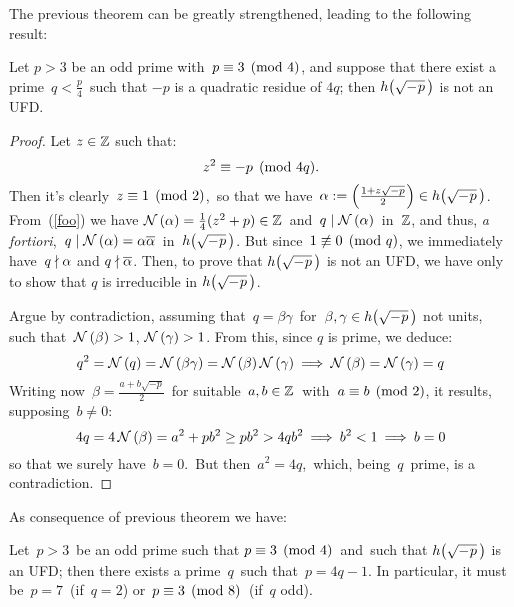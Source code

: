 The previous theorem can be greatly strengthened, leading to
the following result:

\begin{thm}\label{first_theorem_on_uniqueness_in_complex_h(sqrt(-p))}
Let $p > 3$ be an odd prime with\, $p \equiv 3 \pmod 4$, and
suppose that there exist a prime \,$q < \frac{p}{4}$\, such that $-p$
is a quadratic residue of $4q$; then $\hhm{p}$ is not an UFD.
\end{thm}

\begin{proof}
%
Let $z \in \mathbb{Z}$ such that: 
\begin{equation}\label{foo}
z^2 \equiv -p \pmod{4q}.
\end{equation}
Then it's clearly\, $z \equiv 1 \pmod 2$,\, so that we have\,
$\alpha := \left(\frac{1 + z\sqrt{-p}}{2}\right) \in \hhm{p}$.
From~(\ref{foo}) we have
$\mathcal{N}\left(\alpha\right) = \frac{1}{4}(z^2 + p) \in \mathbb{Z}$\,
and\, $q \mid \mathcal{N}\left(\alpha\right)$\, in\, $\mathbb{Z}$, and
thus, \textit{a fortiori},\, $q \mid \mathcal{N}\left(\alpha\right)
= \alpha\overline{\alpha}$\, in\, $\hhm{p}$. But since\,
$1 \not\equiv 0 \pmod{q}$, we immediately have\,
$q \nmid \alpha$ and $q \nmid \overline{\alpha}$.
Then, to prove that $\hhm{p}$ is not an UFD, we have only to
show that $q$ is irreducible in $\hhm{p}$.

Argue by contradiction, assuming that\, $q = \beta\gamma$
\,for\, $\beta, \gamma \in \hhm{p}$ not units,
\ie such that\, $\mathcal{N}\left(\beta\right) > 1$, $\mathcal{N}\left(\gamma\right) > 1$.
From this, since $q$ is prime, we deduce:
$$
q^2 = \mathcal{N}\left(q\right) = \mathcal{N}\left(\beta\gamma\right) =
\mathcal{N}\left(\beta\right) \mathcal{N}\left(\gamma\right) \:\Longrightarrow\:
\mathcal{N}\left(\beta\right) = \mathcal{N}\left(\gamma\right) = q
$$
Writing now\, $\beta = \frac{a + b\sqrt{-p}}{2}$\, for
suitable\, $a,b \in \mathbb{Z}$\, with\, $a \equiv b \pmod 2$,
it results, supposing\, $b \ne 0$:
$$
4q = 4\,\mathcal{N}\left(\beta\right) = a^2 + pb^2 \geq pb^2 > 4qb^2
\:\Longrightarrow\: b^2 < 1 \:\Longrightarrow\: b = 0
$$
so that we surely have\, $b = 0$.\, But then\, $a^2 = 4q$,
\,which, being\, $q$\, prime, is a contradiction.
%
\end{proof}

As consequence of previous theorem we have:
\begin{cor}\label{second_theorem_on_uniqueness_in_complex_h(sqrt(-p))}
Let\, $p > 3$\, be an odd prime such that
$p \equiv 3 \pmod 4$\, and\, such that $\hhm{p}$
is an UFD; then there exists a prime\, $q$\, such that\,
$p = 4q - 1$.
In particular, it must be\, $p = 7$\, (if\, $q = 2$) or\,
$p \equiv 3 \pmod 8$\, (if\, $q$ odd).
\end{cor}

